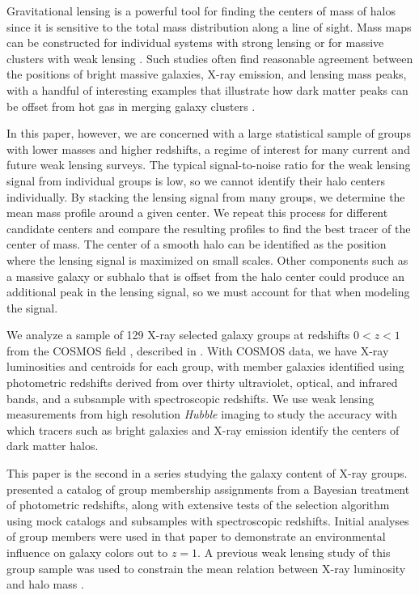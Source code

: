 \documentclass[12pt]{emulateapj}
\begin{document}
Gravitational lensing is a powerful tool for finding the centers of mass of halos
since it is sensitive to the total mass distribution along a line of
sight. Mass maps can be constructed for individual systems with strong
lensing or for massive clusters with weak lensing
\citep[e.g.,][]{Smith2005b, Oguri2010, Shan2010}. Such studies often 
find reasonable agreement between the positions of bright massive
galaxies, X-ray emission, and lensing mass peaks, with a handful of
interesting examples that illustrate how dark matter peaks can be
offset from hot gas in merging galaxy clusters
\citep[e.g.,][]{Clowe2004, Bradac2008}. 

In this paper, however, we are concerned with a large statistical
sample of groups with lower masses and higher redshifts, a regime of
interest for many current and future weak lensing surveys. The typical
signal-to-noise ratio for the weak lensing signal from individual groups is
low, so we cannot identify their halo centers individually. By stacking
the lensing signal from many groups, we determine the mean mass
profile around a given center. We repeat this process for
different candidate centers and compare the resulting profiles to find
the best tracer of the center of mass.
The center of a smooth halo can be identified as the position where
the lensing signal is maximized on small scales. Other components such
as a massive galaxy or subhalo that is offset from the halo center
could produce an additional peak in the lensing signal, so we must
account for that when modeling the signal.

We analyze a sample of 129 X-ray selected galaxy groups at redshifts
$0<z<1$ from the COSMOS field \citep{Scoville2007a}, described in
\citet{George2011}.  With 
COSMOS data, we have X-ray luminosities and centroids for each group,
with member galaxies identified using photometric redshifts derived
from over thirty ultraviolet, optical, and infrared bands, and a
subsample with spectroscopic redshifts. We use weak lensing
measurements from high resolution \textit{Hubble} imaging to study the
accuracy with which tracers such as bright galaxies and X-ray emission
identify the centers of dark matter halos.

This paper is the second in a series studying the galaxy content of
X-ray groups. \citet[][hereafter Paper~I]{George2011} presented a
catalog of group membership assignments from a Bayesian treatment of
photometric redshifts, along with extensive tests of the selection
algorithm using mock catalogs and subsamples with spectroscopic
redshifts. Initial analyses of group members were used in that paper
to demonstrate an environmental influence on galaxy colors out to
$z=1$. A previous weak lensing study of this group sample was used to
constrain the mean relation between X-ray luminosity and halo mass
\citep{Leauthaud2010}. 
\end{document}
